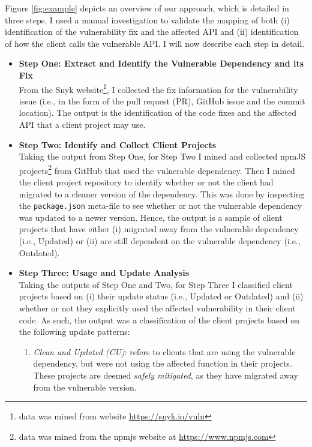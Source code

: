 Figure \ref{fig:example} depicts an overview of our approach, which is detailed in three steps.
I used a manual investigation to validate the mapping of both (i) identification of the vulnerability fix and the affected API and (ii) identification of how the client calls the vulnerable API.
I will now describe each step in detail.
\begin{itemize}
    \item \textbf{Step One: Extract and Identify the Vulnerable Dependency and its Fix} \\
    From the Snyk website\footnote{data was mined from website \url{https://snyk.io/vuln}}, I collected the fix information for the vulnerability issue (i.e., in the form of the pull request (PR), GitHub issue and the commit location). 
    The output is the identification of the code fixes and the affected API that a client project may use.
    
    \item \textbf{Step Two: Identify and Collect Client Projects } \\
    Taking the output from Step One, for Step Two I mined and collected npmJS projects\footnote{data was mined from the npmjs website at \url{https://www.npmjs.com}} from GitHub that used the vulnerable dependency.
    Then I mined the client project repository to identify whether or not the client had migrated to a cleaner version of the dependency.
    This was done by inspecting the \texttt{package.json} meta-file to see whether or not the vulnerable dependency was updated to a newer version.
    Hence, the output is a sample of client projects that have either (i) migrated away from the vulnerable dependency (i.e., Updated) or (ii) are still dependent on the vulnerable dependency (i.e., Outdated). 
    
    \item \textbf{Step Three: Usage and Update Analysis} \\
    Taking the outputs of Step One and Two, for Step Three I classified client projects based on (i) their update status (i.e., Updated or Outdated) and (ii) whether or not they explicitly used the affected vulnerability in their client code.
    As such, the output was a classification of the client projects based on the  following update patterns: 
\begin{enumerate}
    \item \textit{Clean and Updated (CU)}: refers to clients that are using the vulnerable dependency, but were not using the affected function in their projects. These projects are deemed \textit{safely mitigated}, as they have migrated away from the vulnerable version. 
    

\end{enumerate}
\end{itemize}

